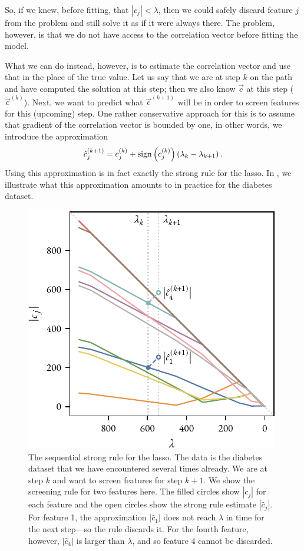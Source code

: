 So, if we knew, before fitting, that \(|c_j| < \lambda\), then we could safely discard feature \(j\) from the problem and still solve it as if it were always there. The problem, however, is that we do not have access to the correlation vector before fitting the model.

What we can do instead, however, is to estimate the correlation vector and use that in the place of the true value. Let us say that we are at step \(k\) on the path and have computed the solution at this step; then we also know \(\vec{c}\) at this step (\(\vec{c}^{(k)}\)). Next, we want to predict what \(\vec{c}^{(k+1)}\) will be in order to screen features for this (upcoming) step. One rather conservative approach for this is to assume that gradient of the correlation vector is bounded by one, in other words, we introduce the approximation
\[
  \hat{c}_j^{(k+1)} = c_j^{(k)} + \operatorname{sign}\left(c_j^{(k)}\right)\left(\lambda_k - \lambda_{k+1}\right).
\]
Using this approximation is in fact exactly the strong rule for the lasso. In , we illustrate what this approximation amounts to in practice for the diabetes dataset.

\begin{figure}[htpb]
  \centering
  \includegraphics[]{figures/strong-rule.pdf}
  \caption{%
    The sequential strong rule for the lasso. The data is the diabetes dataset that we have encountered several times already. We are at step \(k\) and want to screen features for step \(k+1\). We show the screening rule for two features here. The filled circles show \(|c_j|\) for each feature and the open circles show the strong rule estimate \(|\hat{c}_j|\). For feature 1, the approximation \(|\hat{c}_1|\) does not reach \(\lambda\) in time for the next step---so the rule discards it. For the fourth feature, however, \(|\hat{c}_4|\) is larger than \(\lambda\), and so feature 4 cannot be discarded.
  }
  \label{fig:strong-rule}
\end{figure}

